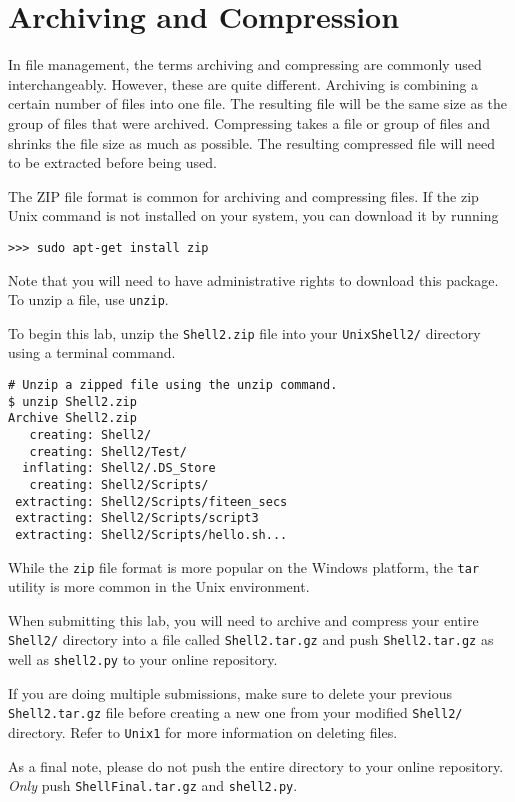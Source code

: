 

\section*{Archiving and Compression} %
In file management, the terms archiving and compressing are commonly used interchangeably.
However, these are quite different.
Archiving is combining a certain number of files into one file.
The resulting file will be the same size as the group of files that were archived. 
Compressing takes a file or group of files and shrinks the file size as much as possible. 
The resulting compressed file will need to be extracted before being used.

The ZIP file format is common for archiving and compressing files. 
If the zip Unix command is not installed on your system, you can download it by running 
\begin{lstlisting}
>>> sudo apt-get install zip
\end{lstlisting}
Note that you will need to have administrative rights to download this package. 
To unzip a file, use \texttt{unzip}.

\begin{info}
To begin this lab, unzip the \texttt{Shell2.zip} file into your \texttt{UnixShell2/} directory using a terminal command.
\end{info}

\begin{lstlisting}
# Unzip a zipped file using the unzip command.
$ unzip Shell2.zip
Archive Shell2.zip
   creating: Shell2/
   creating: Shell2/Test/
  inflating: Shell2/.DS_Store        
   creating: Shell2/Scripts/
 extracting: Shell2/Scripts/fiteen_secs  
 extracting: Shell2/Scripts/script3  
 extracting: Shell2/Scripts/hello.sh...
\end{lstlisting}

While the \texttt{zip} file format is more popular on the Windows platform, the \texttt{tar} utility is more
common in the Unix environment.

\begin{info}
When submitting this lab, you will need to archive and compress your entire \texttt{Shell2/} directory into a file called \texttt{Shell2.tar.gz} and push \texttt{Shell2.tar.gz} as well as \texttt{shell2.py} to your online repository.

If you are doing multiple submissions, make sure to delete your previous \texttt{Shell2.tar.gz} file before creating a new one from your modified \texttt{Shell2/} directory.
Refer to \texttt{Unix1} for more information on deleting files.

As a final note, please do not push the entire directory to your online repository.
\emph{Only} push \texttt{ShellFinal.tar.gz} and \texttt{shell2.py}.
\end{info}

